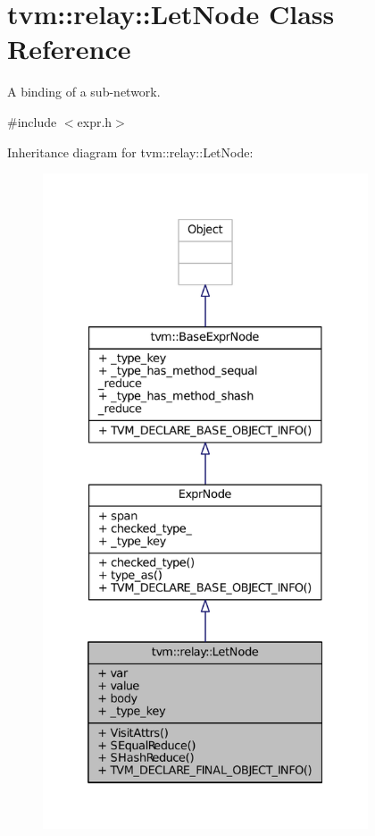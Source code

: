 \hypertarget{classtvm_1_1relay_1_1LetNode}{}\section{tvm\+:\+:relay\+:\+:Let\+Node Class Reference}
\label{classtvm_1_1relay_1_1LetNode}


A binding of a sub-\/network.  




{\ttfamily \#include $<$expr.\+h$>$}



Inheritance diagram for tvm\+:\+:relay\+:\+:Let\+Node\+:
\nopagebreak
\begin{figure}[H]
\begin{center}
\leavevmode
\includegraphics[height=550pt]{classtvm_1_1relay_1_1LetNode__inherit__graph}
\end{center}
\end{figure}


